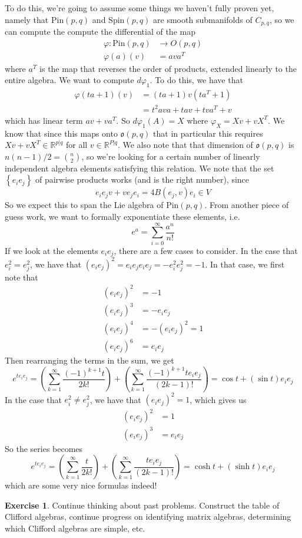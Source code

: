 \documentclass[psamsfonts]{amsart}
\theoremstyle{definition}
\newtheorem{exer}[thm]{Exercise}
\theoremstyle{remark}
\newcommand{\R}{\mathbb{R}}
\newcommand{\Spin}{\mathrm{Spin}}
\newcommand{\Pin}{\mathrm{Pin}}
\newcommand{\set}[1]{\left\lbrace #1 \right\rbrace}
\begin{document}
To do this, we're going to assume some things we haven't fully proven yet, namely that $\Pin(p,q)$ and $\Spin(p,q)$ are smooth submanifolds of $C_{p,q}$, so we can compute the compute the differential of the map
\begin{align*}
\varphi : \Pin(p,q) &\to O(p,q) \\
\varphi(a)(v) &= ava^T
\end{align*}
where $a^T$ is the map that reverses the order of products, extended linearly to the entire algebra. We want to compute $d\varphi_1$. To do this, we have that 
\begin{align*}
\varphi(ta + 1)(v) &= (ta + 1)v(ta^T + 1) \\
&= t^2ava + tav + tva^T + v
\end{align*}
which has linear term $av + va^T$. So $d\varphi_1(A) = X$ where $\varphi_X = Xv+  vX^T$. We know that since this maps onto $\mathfrak{o}(p,q)$ that in particular this requires $Xv + vX^T \in \R^{p|q}$ for all $v \in \R^{P|q}$. We also note that that dimension of $\mathfrak{o}(p,q)$ is $n(n-1)/2 = \binom{n}{2}$, so we're looking for a certain number of linearly independent algebra elements satisfying this relation. We note that the set $\set{e_ie_j}$ of pairwise products works (and is the right number), since 
$$e_ie_jv + ve_je_i = 4B(e_j,v)e_i \in V$$
So we expect this to span the Lie algebra of $\Pin(p,q)$. From another piece of guess work, we want to formally exponentiate these elements, i.e. 
$$e^a = \sum_{i = 0}^\infty \frac{a^n}{n!} $$
If we look at the elements $e_ie_j$, there are a few cases to consider. In the case that $e_i^2 = e_j^2$, we have that $(e_ie_j)^2 = e_ie_je_ie_j = -e_i^2e_j^2 = -1$. In that case, we first note that 
\begin{align*}
(e_ie_j)^2  &= -1 \\
(e_ie_j)^3 &= -e_ie_j \\
(e_ie_j)^4 &= -(e_ie_j)^2 = 1 \\
(e_ie_j)^6 &= e_ie_j
\end{align*}
Then rearranging the terms in the sum, we get 
$$e^{te_ie_j} = \left(\sum_{k = 1}^\infty \frac{(-1)^{k+1}t}{2k !} \right) + \left(\sum_{k = 1}^\infty \frac{(-1)^{k+1}te_ie_j}{(2k-1)!} \right) = \cos t + (\sin t) e_ie_j$$
In the case that $e_i^2 \neq e_j^2$, we have that $(e_ie_j)^2 = 1$, which gives us
\begin{align*}
(e_ie_j)^2 &= 1 \\
(e_ie_j)^3 &= e_ie_j
\end{align*}
So the series becomes
$$e^{te_ie_j} = \left( \sum_{k=1}^\infty \frac{t}{2k !} \right)  + \left( \sum_{k = 1}^\infty \frac{te_ie_j}{(2k - 1)!}\right) = \cosh t + (\sinh t)e_ie_j$$
which are some very nice formulas indeed!
%
\begin{exer}
Continue thinking about past problems. Construct the table of Clifford algebras, continue progress on identifying matrix algebras, determining which Clifford algebras are simple, etc.
\end{exer}
%
\setcounter{section}{8}
%
\setcounter{thm}{0}
\end{document}
